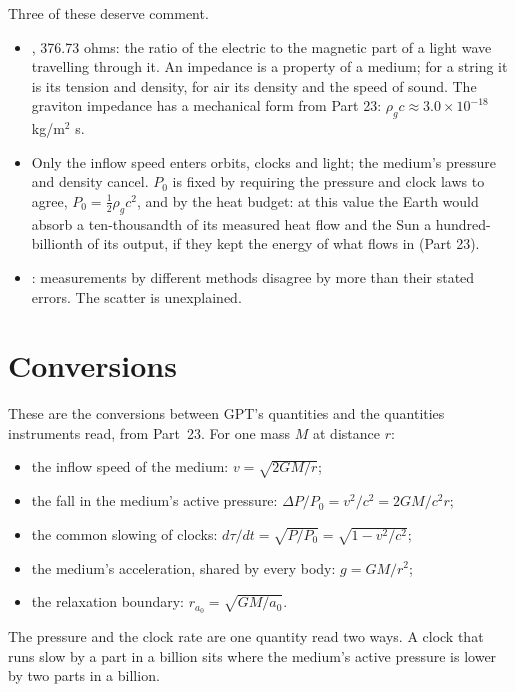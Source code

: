 \documentclass[11pt,a4paper]{article}
\begin{document}
Three of these deserve comment.
\begin{itemize}
\item {}, 376.73 ohms: the ratio of the electric to the magnetic part of a light wave travelling through it. An impedance is a property of a medium; for a string it is its tension and density, for air its density and the speed of sound.  The graviton impedance has a mechanical form from Part 23: $\rho_g c \approx 3.0\times10^{-18}$ kg/m$^2$ s.
\item {} Only the inflow speed enters orbits, clocks and light; the medium's pressure and density cancel. $P_0$ is fixed by requiring the pressure and clock laws to agree, $P_0=\tfrac12\rho_g c^2$, and by the heat budget: at this value the Earth would absorb a ten-thousandth of its measured heat flow and the Sun a hundred-billionth of its output, if they kept the energy of what flows in (Part 23).
\item {}: measurements by different methods disagree by more than their stated errors. The scatter is unexplained.
\end{itemize}

\section{Conversions}
\label{sec:conversions}

\begin{hypbar}
These are the conversions between GPT's quantities and the quantities instruments read, from Part~23. For one mass $M$ at distance $r$:
\begin{itemize}
\item the inflow speed of the medium: $v = \sqrt{2GM/r}$;
\item the fall in the medium's active pressure: $\Delta P/P_0 = v^2/c^2 = 2GM/c^2 r$;
\item the common slowing of clocks: $d\tau/dt = \sqrt{P/P_0} = \sqrt{1-v^2/c^2}$;
\item the medium's acceleration, shared by every body: $g = GM/r^2$;
\item the relaxation boundary: $r_{a_0} = \sqrt{GM/a_0}$.
\end{itemize}
The pressure and the clock rate are one quantity read two ways. A clock that runs slow by a part in a billion sits where the medium's active pressure is lower by two parts in a billion.
\end{hypbar}
\end{document}
